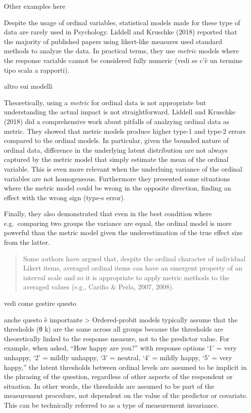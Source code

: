 \documentclass[
  man,floatsintext]{apa6}
\begin{document}
Other examples here

Despite the usage of ordinal variables, statistical models made for these type of data are rarely used in Psychology. Liddell and Kruschke (2018) reported that the majority of published papers using likert-like measures used standard methods to analyze the data. In practical terms, they use \emph{metric} models where the response variable cannot be considered fully numeric (vedi se c'è un termine tipo scala a rapporti).

altro sui modelli

Theoretically, using a \emph{metric} for ordinal data is not appropriate but understanding the actual impact is not straightforward. Liddell and Kruschke (2018) did a comprehensive work about pitfalls of analzying ordinal data as metric. They showed that metric models produce higher type-1 and type-2 errors compared to the ordinal models. In particular, given the bounded nature of ordinal data, difference in the underlying latent distribution are not always captured by the metric model that simply estimate the mean of the ordinal variable. This is even more relevant when the underluing variance of the ordinal variables are not homogeneous. Furthermore they presented some situations where the metric model could be wrong in the opposite direction, finding an effect with the wrong sign (type-s error).

Finally, they also demonstrated that even in the best condition where e.g.~comparing two groups the variance are equal, the ordinal model is more powerful than the metric model given the underestimation of the true effect size from the latter.

\begin{quote}
Some authors have argued that, despite the ordinal character of individual Likert items, averaged ordinal items can have an emergent property of an interval scale and so it is appropriate to apply metric methods to the averaged values (e.g., Carifio \& Perla, 2007, 2008).
\end{quote}

vedi come gestire questo

anche questo è importante
\textgreater{} Ordered-probit models typically assume that the thresholds (θ k) are the same across all groups because the thresholds are theoretically linked to the response measure, not to the predictor value. For example, when asked, ``How happy are you?'' with response options `1' = very unhappy, `2' = mildly unhappy, `3' = neutral, `4' = mildly happy, `5' = very happy,'' the latent thresholds between ordinal levels are assumed to be implicit in the phrasing of the question, regardless of other aspects of the respondent or situation. In other words, the thresholds are assumed to be part of the measurement procedure, not dependent on the value of the predictor or covariate. This can be technically referred to as a type of measurement invariance.
\end{document}
